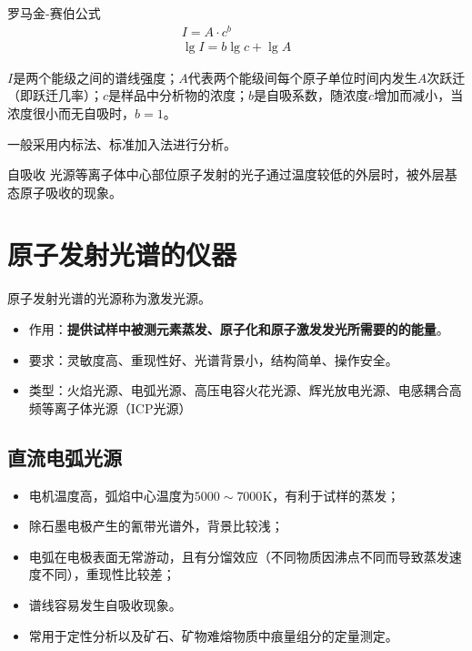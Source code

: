 \begin{theorem*}{罗马金-赛伯公式}{}
	\begin{gather*}
		I=A\cdot c^b\\
		\lg I = b \lg c + \lg A
	\end{gather*}
	
	$I$是两个能级之间的谱线强度；$A$代表两个能级间每个原子单位时间内发生$A$次跃迁（即跃迁几率）；$c$是样品中分析物的浓度；$b$是自吸系数，随浓度$c$增加而减小，当浓度很小而无自吸时，$b=1$。
\end{theorem*}


一般采用内标法、标准加入法进行分析。

\begin{definition*}{自吸收}{}
	光源等离子体中心部位原子发射的光子通过温度较低的外层时，被外层基态原子吸收的现象。
\end{definition*}

\section{原子发射光谱的仪器}

原子发射光谱的光源称为激发光源。
\begin{itemize}
	\item 作用：\textbf{提供试样中被测元素蒸发、原子化和原子激发发光所需要的的能量}。
	\item 要求：灵敏度高、重现性好、光谱背景小，结构简单、操作安全。
	\item 类型：火焰光源、电弧光源、高压电容火花光源、辉光放电光源、电感耦合高频等离子体光源（ICP光源）
\end{itemize}

\subsection{直流电弧光源}
\begin{itemize}
	\item 电机温度高，弧焰中心温度为$5000\sim 7000\mathrm{K}$，有利于试样的蒸发；
	\item 除石墨电极产生的氰带光谱外，背景比较浅；
	\item 电弧在电极表面无常游动，且有分馏效应（不同物质因沸点不同而导致蒸发速度不同），重现性比较差；
	\item 谱线容易发生自吸收现象。
	\item 常用于定性分析以及矿石、矿物难熔物质中痕量组分的定量测定。
\end{itemize}

